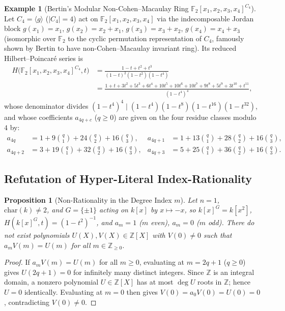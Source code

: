 \documentclass[11pt]{article}
\newtheorem{proposition}[theorem]{Proposition}
\theoremstyle{definition}
\newtheorem{example}[theorem]{Example}
\theoremstyle{remark}
\begin{document}
\begin{example}[{Bertin's Modular Non-Cohen--Macaulay Ring $\mathbb{F}_2[x_1,x_2,x_3,x_4]^{C_4}$}]
\label{ex:bertin}
Let $C_4 = \langle g \rangle$ ($|C_4| = 4$) act on $\mathbb{F}_2[x_1,x_2,x_3,x_4]$ via the indecomposable Jordan block $g(x_1) = x_1$, $g(x_2) = x_2 + x_1$, $g(x_3) = x_3 + x_2$, $g(x_4) = x_4 + x_3$ (isomorphic over $\mathbb{F}_2$ to the cyclic permutation representation of $C_4$, famously shown by Bertin \cite{Bertin1967} to have non-Cohen--Macaulay invariant ring). Its reduced Hilbert--Poincar\'e series is
\[
\begin{aligned}
H\bigl(\mathbb{F}_2[x_1,x_2,x_3,x_4]^{C_4}, t\bigr)
&= \frac{1 - t + t^2 + t^3}{(1 - t)^2 (1 - t^2)(1 - t^4)}\\
&= \frac{1 + t + 3t^2 + 5t^3 + 6t^4 + 10t^5 + 10t^6 + 10t^7 + 9t^8 + 5t^9 + 3t^{10} + t^{11}}{(1 - t^4)^4},
\end{aligned}
\]
whose denominator divides $(1 - t^4)^4 \mid (1 - t^4)(1 - t^8)(1 - t^{16})(1 - t^{32})$, and whose coefficients $a_{4q+c}$ ($q \ge 0$) are given on the four residue classes modulo $4$ by:
\begin{align*}
a_{4q}   &= 1 + 9\binom{q}{1} + 24\binom{q}{2} + 16\binom{q}{3}, &
a_{4q+1} &= 1 + 13\binom{q}{1} + 28\binom{q}{2} + 16\binom{q}{3},\\
a_{4q+2} &= 3 + 19\binom{q}{1} + 32\binom{q}{2} + 16\binom{q}{3}, &
a_{4q+3} &= 5 + 25\binom{q}{1} + 36\binom{q}{2} + 16\binom{q}{3}.
\end{align*}
\end{example}

\subsection{Refutation of Hyper-Literal Index-Rationality}

\begin{proposition}[Non-Rationality in the Degree Index $m$]
\label{prop:index}
Let $n = 1$, $\mathrm{char}(k) \ne 2$, and $G = \{\pm 1\}$ acting on $k[x]$ by $x \mapsto -x$, so $k[x]^G = k[x^2]$, $H(k[x]^G, t) = (1 - t^2)^{-1}$, and $a_m = 1$ ($m$ even), $a_m = 0$ ($m$ odd). There do not exist polynomials $U(X), V(X) \in \mathbb{Z}[X]$ with $V(0) \ne 0$ such that $a_m V(m) = U(m)$ for all $m \in \mathbb{Z}_{\ge 0}$.
\end{proposition}

\begin{proof}
If $a_m V(m) = U(m)$ for all $m \ge 0$, evaluating at $m = 2q + 1$ ($q \ge 0$) gives $U(2q + 1) = 0$ for infinitely many distinct integers. Since $\mathbb{Z}$ is an integral domain, a nonzero polynomial $U \in \mathbb{Z}[X]$ has at most $\deg U$ roots in $\mathbb{Z}$; hence $U = 0$ identically. Evaluating at $m = 0$ then gives $V(0) = a_0 V(0) = U(0) = 0$, contradicting $V(0) \ne 0$.
\end{proof}
\end{document}
